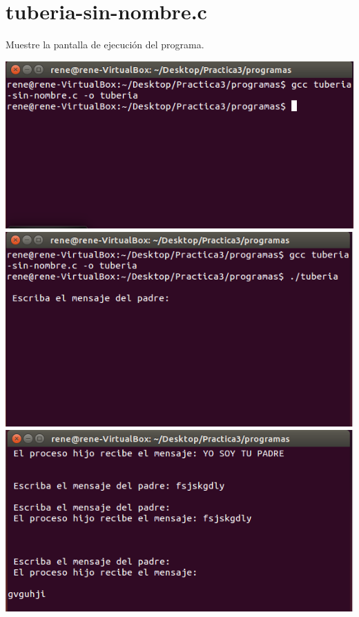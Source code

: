 \section{tuberia-sin-nombre.c}

	Muestre la pantalla de ejecución del programa.

	\begin{center}
		\includegraphics{imagenes/Captura.png}
		\includegraphics{imagenes/Captura2.png}
		\includegraphics{imagenes/Captura3.png}

\end{center}
